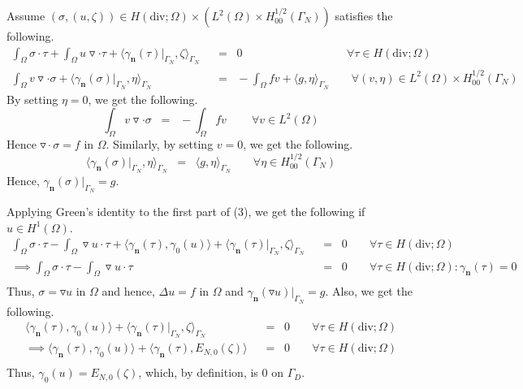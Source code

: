 \documentclass[12pt]{article}
\begin{document}
 Assume $(\sigma,(u,\zeta))\in H(\text{div};\Omega)\times (L^2(\Omega)\times H^{1/2}_{00}(\Gamma_N))$ satisfies the following.
 \begin{equation}
\begin{split}
\int_{\Omega}\sigma\cdot\tau +\int_{\Omega}u\triangledown\cdot\tau +  \langle \gamma_{\textbf{n}}(\tau)|_{\Gamma_N},\zeta \rangle _{\Gamma_N}& \;\;=\;\; 0\;\;\;\;\;\;\;\;\;\;\;\;\;\;\;\;\;\;\;\;\;\;\;\;\;\;\;\;\;\;\;\;\;\forall\tau\in H(\text{div};\Omega)\\
\int_{\Omega}v\triangledown\cdot\sigma +  \langle \gamma_{\textbf{n}}(\sigma)|_{\Gamma_N},\eta \rangle _{\Gamma_N} & \;\;=\;\; -\int_{\Omega}fv+ \langle g,\eta \rangle _{\Gamma_N}\;\;\;\;\;\;\;\forall (v,\eta) \in L^2(\Omega)\times H^{1/2}_{00}(\Gamma_N)
\end{split}
\end{equation}
By setting $\eta=0$, we get the following.
$$ \int_{\Omega}v\triangledown\cdot\sigma \;\;=\;\; -\int_{\Omega}fv\;\;\;\;\;\;\;\;\forall v \in L^2(\Omega) $$
Hence $\triangledown\cdot\sigma=f$ in $\Omega$. Similarly, by setting $v=0$, we get the following.
 $$   \langle \gamma_{\textbf{n}}(\sigma)|_{\Gamma_N},\eta \rangle _{\Gamma_N}  \;\;=\;\; \langle g,\eta \rangle _{\Gamma_N}\;\;\;\;\;\;\;\forall \eta \in H^{1/2}_{00}(\Gamma_N) $$
Hence, $\gamma_{\textbf{n}}(\sigma)|_{\Gamma_N}=g$.

Applying Green's identity to the first part of (3), we get the following if $u\in H^1(\Omega)$.
\begin{equation*}
\begin{split}
\int_{\Omega}\sigma\cdot\tau -\int_{\Omega}\triangledown u\cdot \tau +  \langle \gamma_{\textbf{n}}(\tau),\gamma_0 (u) \rangle  +  \langle \gamma_{\textbf{n}}(\tau)|_{\Gamma_N},\zeta \rangle _{\Gamma_N} \;\;&=\;\; 0\;\;\;\;\;\;\;\forall\tau\in H(\text{div};\Omega)\\
\implies \int_{\Omega}\sigma\cdot\tau -\int_{\Omega}\triangledown u\cdot \tau  \;\;&=\;\; 0\;\;\;\;\;\;\;\forall\tau\in H(\text{div};\Omega):\gamma_{\textbf{n}}(\tau)=0 \\
\end{split}
\end{equation*}
Thus, $\sigma=\triangledown u$ in $\Omega$ and hence, $\Delta u=f$ in $\Omega$ and $\gamma_{\textbf{n}}(\triangledown u)|_{\Gamma_N}=g$. Also, we get the following.
\begin{equation*}
\begin{split}
 \langle \gamma_{\textbf{n}}(\tau),\gamma_0 (u) \rangle  +  \langle \gamma_{\textbf{n}}(\tau)|_{\Gamma_N},\zeta \rangle _{\Gamma_N} \;\;&=\;\; 0\;\;\;\;\;\;\;\forall\tau\in H(\text{div};\Omega)\\
\implies  \langle \gamma_{\textbf{n}}(\tau),\gamma_0 (u) \rangle  +  \langle \gamma_{\textbf{n}}(\tau),E_{N,0}(\zeta) \rangle  \;\;&=\;\; 0\;\;\;\;\;\;\;\forall\tau\in H(\text{div};\Omega)\\
\end{split}
\end{equation*}
Thus, $\gamma_0(u)=E_{N,0}(\zeta)$, which, by definition, is $0$ on $\Gamma_D$.
\end{document}
